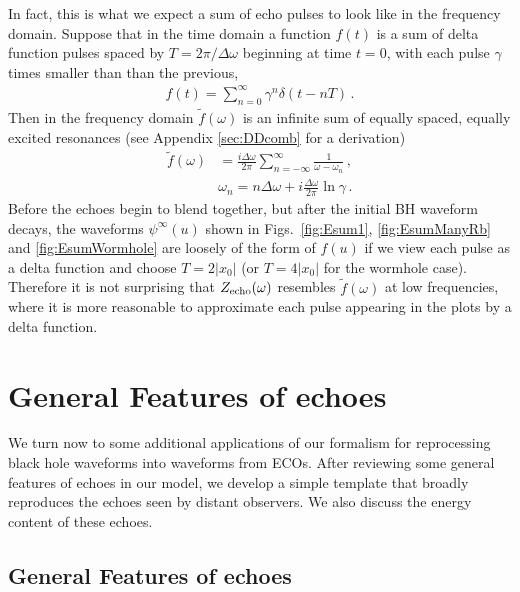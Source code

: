 \begin{refsection}
In fact, this is what we expect a sum of echo pulses to look like in the frequency domain. Suppose that in the time domain a function $f(t)$ is a sum of delta function pulses spaced by $T=2\pi/\Delta\omega$ beginning at time $t=0$, with each pulse $\gamma$ times smaller than than the previous,
\begin{align}
\label{eq:DDcomb}
f(t)=\sum_{n=0}^\infty \gamma^n \delta\left(t-nT\right) \,.
\end{align}
Then in the frequency domain $\tilde f(\omega)$ is an infinite sum of equally spaced, equally excited resonances (see Appendix \ref{sec:DDcomb} for a derivation)
\begin{align}
\tilde f(\omega)&=\frac{i\Delta \omega}{2\pi}\sum_{n=-\infty}^\infty\frac{1}{\omega-\omega_n} \,,\nonumber \\
&\omega_n=n\Delta \omega+i\frac{\Delta \omega}{2\pi}\ln \gamma \,. 
\label{eq:DDcombFT}
\end{align}
Before the echoes begin to blend together, but after the initial BH waveform decays, the waveforms $\psi^{\infty}(u)$ shown in Figs.~\ref{fig:Esum1}, \ref{fig:EsumManyRb} and \ref{fig:EsumWormhole} are loosely of the form of $f(u)$ if we view each pulse as a delta function and choose $ T = 2|x_0|$ (or $T = 4 |x_0|$ for the wormhole case). Therefore it is not surprising that $Z_{\rm echo}(\omega)$ resembles $\tilde f(\omega)$ at low frequencies, where it is more reasonable to approximate each pulse appearing in the plots by a delta function. 


\section{General Features of echoes}
\label{sec:Gen}

We turn now to some additional applications of our formalism for reprocessing black hole waveforms into waveforms from ECOs.
After reviewing some general features of echoes in our model, we develop a simple template that broadly reproduces the echoes seen by distant observers.
We also discuss the energy content of these echoes.

\subsection{General Features of echoes}
\label{sec:GFEA}


\end{refsection}
